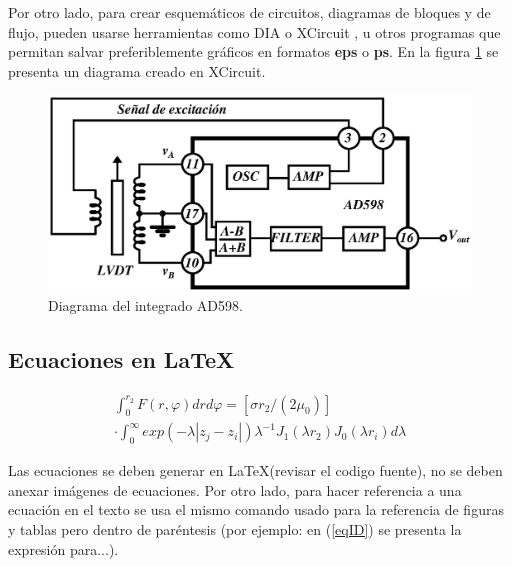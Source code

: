 \documentclass[journal]{IEEEtran}
\begin{document}
Por otro lado, para crear esquemáticos de circuitos, diagramas de bloques y de flujo, pueden usarse herramientas como DIA \cite{dia} o XCircuit \cite{xcircuit}, u otros programas que permitan salvar preferiblemente gráficos en formatos \textbf{eps} o \textbf{ps}. En la figura \ref{diafig} se presenta un diagrama creado en XCircuit.
\begin{figure}[H] %
\centering  %
\includegraphics[scale=0.5]{LVDT4} %
\caption{Diagrama del integrado AD598.} %
\label{diafig} %
\end{figure}

\subsection{Ecuaciones en \LaTeX}

\begin{multline}\label{eqID}
\int^{r_2}_{0} F\left(r,\varphi\right)drd\varphi=\left[\sigma r_2/\left(2\mu_0\right)\right] \\ \cdot \int^{\infty}_{0} exp\left(-\lambda|z_j-z_i|\right)\lambda^{-1}J_1\left(\lambda r_2\right)J_0\left(\lambda r_i\right)d\lambda
\end{multline}

Las ecuaciones se deben generar en \LaTeX (revisar el codigo fuente), no se deben anexar imágenes de ecuaciones. Por otro lado, para hacer referencia a una ecuación en el texto  se usa el mismo comando usado para la referencia de figuras y tablas pero dentro de paréntesis (por ejemplo: en (\ref{eqID}) se presenta la expresión para...).
\end{document}
